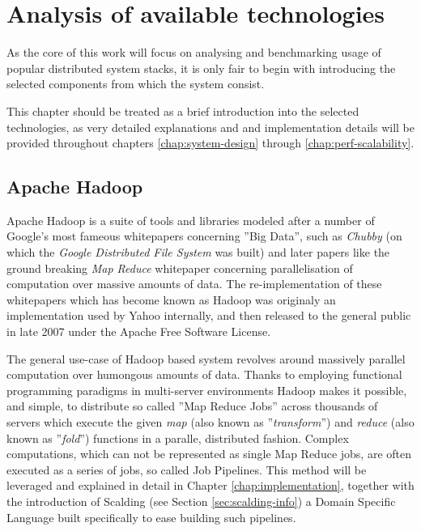 \chapter{Analysis of available technologies}
\label{cha:existing-and-selected-tech}

As the core of this work will focus on analysing and benchmarking usage of popular distributed system stacks, it is only fair to begin with introducing the selected components from which the system consist.

This chapter should be treated as a brief introduction into the selected technologies, as very detailed explanations and and implementation details will be provided throughout chapters \ref{chap:system-design} through \ref{chap:perf-scalability}.

\section{Apache Hadoop}
\label{sec:hadoop}

Apache Hadoop is a suite of tools and libraries modeled after a number of Google's most fameous whitepapers concerning ''Big Data'', such as \textit{Chubby} \cite{chubby} (on which the \textit{Google Distributed File System} \cite{gfs} was built) and later papers like the ground breaking \textit{Map Reduce} \cite{map-reduce} whitepaper concerning parallelisation of computation over massive amounts of data.
The re-implementation of these whitepapers which has become known as Hadoop was originaly an implementation used by Yahoo \cite{yahoo} internally, and then released to the general public in late 2007 under the Apache Free Software License.

The general use-case of Hadoop based system revolves around massively parallel computation over humongous amounts of data. Thanks to employing functional programming paradigms in multi-server environments Hadoop makes it possible, and simple, to distribute so called ''Map Reduce Jobs'' across thousands of servers which execute the given \textit{map} (also known as ''\textit{transform}'') and \textit{reduce} (also known as ''\textit{fold}'') functions in a paralle, distributed fashion. Complex computations, which can not be represented as single Map Reduce jobs, are often executed as a series of jobs, so called Job Pipelines. This method will be leveraged and explained in detail in Chapter \ref{chap:implementation}, together with the introduction of Scalding (see Section \ref{sec:scalding-info}) a Domain Specific Language built specifically to ease building such pipelines.

